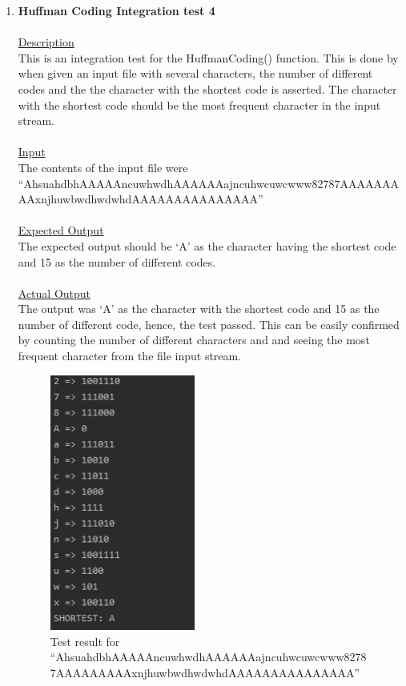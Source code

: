 \documentclass{article}
\newcommand{\quotes}[1]{``#1''}
\begin{document}
\begin{enumerate}
										\item \textbf{Huffman Coding Integration test 4}\\\\
		\underline{Description}\\
		\indent This is an integration test for the HuffmanCoding() function. This is done by when given an input file with several characters, the number of different codes and the the character with the shortest code is asserted. The character with the shortest code should be the most frequent character in the input stream.\\\\
		\underline{Input}\\
		\indent The contents of the input file were \quotes{AhsuahdbhAAAAAncuwhwdhAAAAAAajncuhwcuwcwww82787AAAAAAAAAxnjhuwbwdhwdwhdAAAAAAAAAAAAAAA}\\	\\
		\underline{Expected Output}\\
		\indent The expected output should be `A' as the character having the shortest code and 15 as the number of different codes.\\\\
		\underline{Actual Output}\\
		The output was `A' as the character with the shortest code and 15 as the number of different code, hence, the test passed. This can be easily confirmed by counting the number of different characters and and seeing the most frequent character from the file input stream.
				\begin{figure}[H]
					\centering
			 			\includegraphics[width=0.45\textwidth]{hctest5.png}
			 			\centering
			  			\caption{Test result for \quotes{AhsuahdbhAAAAAncuwhwdhAAAAAAajncuhwcuwcwww82787AAAAAAAAAxnjhuwbwdhwdwhdAAAAAAAAAAAAAAA}}
			  			\label{fig:hctest5}
					\end{figure}
					

\end{enumerate}
\end{document}
